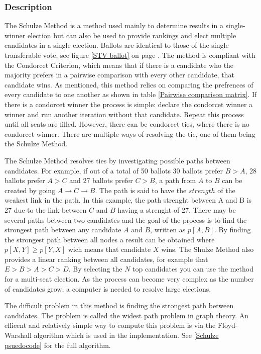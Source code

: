 \subsubsection{Description}
The Schulze Method is a method used mainly to determine results in a single-winner election but can also be used to provide rankings and elect multiple candidates in a single election. Ballots are identical to those of the single transferable vote, see figure \ref{STV ballot} on page \pageref{STV ballot}. The method is compliant with the Condorcet Criterion, which means that if there is a candidate who the majority prefers in a pairwise comparison with every other candidate, that candidate wins. As mentioned, this method relies on comparing the prefrences of every candidate to one another as shown in table \ref{Pairwise comparison matrix}. If there is a condorcet winner the process is simple: declare the condorcet winner a winner and run another iteration without that candidate. Repeat this process until all seats are filled. However, there can be condorcet ties, where there is no condorcet winner. There are multiple ways of resolving the tie, one of them being the Schulze Method.

The Schulze Method resolves ties by investigating possible paths between candidates. For example, if out of a total of 50 ballots 30 ballots prefer $B>A$, 28 ballots prefer $A>C$ and 27 ballots prefer $C>B$, a path from $A$ to $B$ can be created by going $A \rightarrow C \rightarrow B$. The path is said to have the $strength$ of the weakest link in the path. In this example, the path strenght between A and B is 27 due to the link between $C$ and $B$ having a strenght of 27. There may be several paths between two candidates and the goal of the process is to find the strongest path between any candidate $A$ and $B$, written as $p[A,B]$. By finding the strongest path between all nodes a result can be obtained where $p[X,Y] \geq p[Y,X]$ wich means that candidate $X$ wins. The Shulze Method also provides a linear ranking between all candidates, for example that $E > B > A > C > D$. By selecting the $N$ top candidates you can use the method for a multi-seat election. As the process can become very complex as the number of candidates grow, a computer is needed to resolve large elections.

The difficult problem in this method is finding the strongest path between candidates. The problem is called the widest path problem in graph theory. An efficent and relatively simple way to compute this problem is via the Floyd-Warshall algorithm which is used in the implementation. See \ref{Schulze psuedocode} for the full algorithm.

